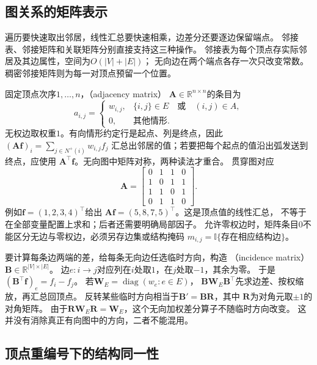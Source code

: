 \subsection{图关系的矩阵表示}
\label{sec:graph-theory-matrix-representations}

遍历要快速取出邻居，线性汇总要快速相乘，边差分还要逐边保留端点。
邻接表、邻接矩阵和关联矩阵分别直接支持这三种操作。
邻接表为每个顶点存实际邻居及其边属性，空间为\(O(|V|+|E|)\)；
无向边在两个端点各存一次只改变常数。稠密邻接矩阵则为每一对顶点预留一个位置。

固定顶点次序\(1,\ldots,n\)，（adjacency matrix）
\(\bm A\in\mathbb R^{n\times n}\)的条目为
\[
  a_{i,j}=
  \begin{cases}
    w_{i,j},&\{i,j\}\in E\quad\text{或}\quad(i,j)\in A,\\
    0,&\text{其他情形}.
  \end{cases}
\]
无权边取权重\(1\)。有向情形约定行是起点、列是终点，因此
\((\bm A\bm f)_i=\sum_{j\in N^+(i)}w_{i,j}f_j\)
汇总出邻居的值；若要把每个起点的值沿出弧发送到终点，应使用
\(\bm A^\top\bm f\)。无向图中矩阵对称，两种读法才重合。
贯穿图对应
\begin{equation}
  \bm A=
  \begin{bmatrix}
    0&1&1&0\\
    1&0&1&1\\
    1&1&0&1\\
    0&1&1&0
  \end{bmatrix}.
  \label{eq:graph-theory-running-adjacency}
\end{equation}
例如\(\bm f=(1,2,3,4)^\top\)给出
\(\bm A\bm f=(5,8,7,5)^\top\)。这是顶点值的线性汇总，
不等于在全部变量配置上求和；后者还需要明确局部因子。
允许零权边时，矩阵条目\(0\)不能区分无边与零权边，必须另存边集或结构掩码
\(m_{i,j}=\mathbb I\{\text{存在相应结构边}\}\)。

要计算每条边两端的差，给每条无向边任选临时方向，构造
（incidence matrix）
\(\bm B\in\mathbb R^{|V|\times|E|}\)。
边\(e:i\to j\)对应列在\(i\)处取\(1\)，在\(j\)处取\(-1\)，其余为零。
于是\((\bm B^\top\bm f)_e=f_i-f_j\)。
若\(\bm W_E=\operatorname{diag}(w_e:e\in E)\)，
\(\bm B\bm W_E\bm B^\top\)先求边差、按权缩放，再汇总回顶点。
反转某些临时方向相当于\(\bm B'=\bm B\bm R\)，其中
\(\bm R\)为对角元取\(\pm1\)的对角矩阵。
由于\(\bm R\bm W_E\bm R=\bm W_E\)，这个无向加权差分算子不随临时方向改变。
这并没有消除真正有向图中的方向，二者不能混用。

\subsection{顶点重编号下的结构同一性}
\label{sec:graph-theory-graph-isomorphism}

